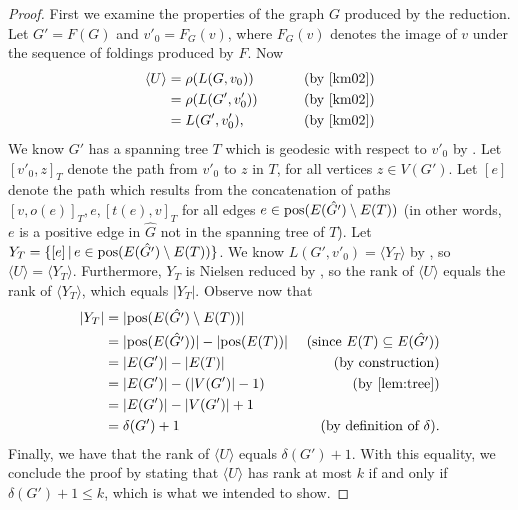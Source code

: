 \documentclass{article}
\newcommand{\gen}[1]{\langle #1 \rangle}
\newcommand{\pos}{\textnormal{pos}}
\begin{document}
\begin{proof}
  First we examine the properties of the graph $G$ produced by the reduction.
  Let $G' = F(G)$ and $v'_0 = F_G(v)$, where $F_G(v)$ denotes the image of $v$ under the sequence of foldings produced by $F$.
  Now
  \begin{align*}
    \gen{U} & = \rho(L(G, v_0)) & \qquad \text{ (by \cite[Proposition~3.8]{km02})} \\
            & = \rho(L(G', v'_0)) & \qquad \text{ (by \cite[Lemma~3.4]{km02})} \\
            & = L(G', v'_0), & \qquad \text{ (by \cite[Lemma~2.9]{km02})}
  \end{align*}
  We know $G'$ has a spanning tree $T$ which is geodesic with respect to $v'_0$ by \cite[Lemma~6.6]{km02}.
  Let $[v'_0, z]_T$ denote the path from $v'_0$ to $z$ in $T$, for all vertices $z \in V(G')$.
  Let $[e]$ denote the path which results from the concatenation of paths $[v, o(e)]_T, e, [t(e), v]_T$ for all edges $e \in \pos(E(\hat{G'}) \setminus E(T))$ (in other words, $e$ is a positive edge in $\hat{G}$ not in the spanning tree of $T$).
  Let $Y_T = \{[e] \, | \, e \in \pos(E(\hat{G'}) \setminus E(T)) \}$.
  We know $L(G', v'_0) = \gen{Y_T}$ by \cite[Lemma~6.1]{km02}, so $\gen{U} = \gen{Y_T}$.
  Furthermore, $Y_T$ is Nielsen reduced by \cite[Proposition~6.7]{km02}, so the rank of $\gen{U}$ equals the rank of $\gen{Y_T}$, which equals $|Y_T|$.
  Observe now that
  \begin{align*}
    |Y_T| & = |\pos(E(\hat{G'}) \setminus E(T))| & \\
          & = |\pos(E(\hat{G'}))| - |\pos(E(T))| & \text{ (since } E(T) \subseteq E(\hat{G'}) \text{)} \\
          & = |E(G')| - |E(T)| & \text{ (by construction)} \\
          & = |E(G')| - (|V(G')| - 1) & \text{ (by \autoref{lem:tree})} \\
          & = |E(G')| - |V(G')| + 1 & \\
          & = \delta(G') + 1 & \text{ (by definition of } \delta \text{)}.
  \end{align*}
  Finally, we have that the rank of $\gen{U}$ equals $\delta(G') + 1$.
  With this equality, we conclude the proof by stating that $\gen{U}$ has rank at most $k$ if and only if $\delta(G') + 1 \leq k$, which is what we intended to show.
\end{proof}
\end{document}
